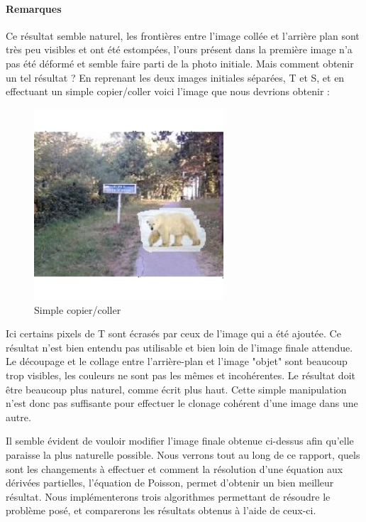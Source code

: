 \paragraph{Remarques}
Ce résultat semble naturel, les frontières entre l'image collée et l'arrière plan sont très peu visibles et ont été estompées, l'ours présent dans la première image n'a pas été déformé et semble faire parti de la photo initiale. 
Mais comment obtenir un tel résultat ?
\newline
En reprenant les deux images initiales séparées, T et S, et en effectuant un simple copier/coller voici l'image que nous devrions obtenir : 
\begin{center}
\begin{figure}[H]
     \centering
     \includegraphics[width = 200pt]{beamIm/cccv.png}
     \caption{Simple copier/coller}
\end{figure}
\end{center}
Ici certains pixels de T sont écrasés par ceux de l'image qui a été ajoutée. Ce résultat n'est bien entendu pas utilisable et bien loin de l'image finale attendue. Le découpage et le collage entre l'arrière-plan et l'image "objet" sont beaucoup trop visibles, les couleurs ne sont pas les mêmes et incohérentes. Le résultat doit être beaucoup plus naturel, comme écrit plus haut. Cette simple manipulation n'est donc pas suffisante pour effectuer le clonage cohérent  d'une image dans une autre. \newline

Il semble évident de vouloir modifier l'image finale obtenue ci-dessus afin qu'elle paraisse la plus naturelle possible.
Nous verrons tout au long de ce rapport, quels sont les changements à effectuer et comment la résolution d'une équation aux dérivées partielles, l'équation de Poisson, permet d'obtenir un bien meilleur résultat. Nous implémenterons trois algorithmes permettant de résoudre le problème posé, et comparerons les résultats obtenus à l'aide de ceux-ci.

